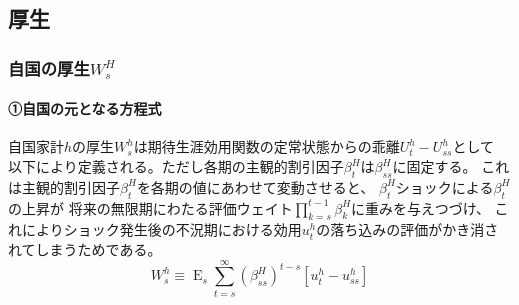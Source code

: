 
\subsection{厚生}
\label{sec:chapter3_representative_household_welfare}

\subsubsection{自国の厚生\(W_s^H\)}
\label{sec:chapter3_representative_household_welfare_home}

\paragraph{①自国の元となる方程式}
\label{sec:chapter3_representative_household_welfare_home_original}
自国家計\(h\)の厚生\(W_s^h\)は期待生涯効用関数の定常状態からの乖離\(U_t^h-U_{ss}^h\)として
以下により定義される。ただし各期の主観的割引因子\(\beta_t^H\)は\(\beta_{ss}^H\)に固定する。
これは主観的割引因子\(\beta_t^H\)を各期の値にあわせて変動させると、
\(\beta_t^H\)ショックによる\(\beta_t^H\)の上昇が
将来の無限期にわたる評価ウェイト\(\prod_{k=s}^{t-1}\beta_k^H\)に重みを与えつづけ、
これによりショック発生後の不況期における効用\(u_t^h\)の落ち込みの評価がかき消されてしまうためである。
\begin{equation}
\label{form:chapter3_representative_household_welfare_home_original_W_h_def}
    W_s^h\equiv\operatorname{E}_s\sum_{t=s}^{\infty}(\beta_{ss}^H)^{t-s}\left[u_t^h-u_{ss}^h\right]
\end{equation}

